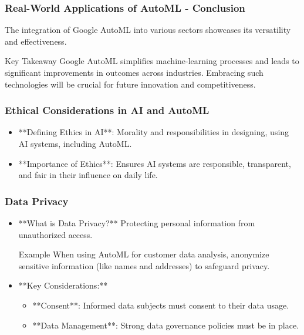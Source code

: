 \documentclass[aspectratio=169]{beamer}
\begin{document}
\begin{frame}[fragile]
  \frametitle{Real-World Applications of AutoML - Conclusion}
  The integration of Google AutoML into various sectors showcases its versatility and effectiveness. 
  \begin{block}{Key Takeaway}
      Google AutoML simplifies machine-learning processes and leads to significant improvements in outcomes across industries. Embracing such technologies will be crucial for future innovation and competitiveness.
  \end{block}
\end{frame}

\begin{frame}[fragile]
    \frametitle{Ethical Considerations in AI and AutoML}
    \begin{itemize}
        \item **Defining Ethics in AI**: Morality and responsibilities in designing, using AI systems, including AutoML.
        \item **Importance of Ethics**: Ensures AI systems are responsible, transparent, and fair in their influence on daily life.
    \end{itemize}
\end{frame}

\begin{frame}[fragile]
    \frametitle{Data Privacy}
    \begin{itemize}
        \item **What is Data Privacy?** Protecting personal information from unauthorized access.
        \begin{block}{Example}
            When using AutoML for customer data analysis, anonymize sensitive information (like names and addresses) to safeguard privacy.
        \end{block}
        \item **Key Considerations:**
        \begin{itemize}
            \item **Consent**: Informed data subjects must consent to their data usage.
            \item **Data Management**: Strong data governance policies must be in place.
        \end{itemize}
    \end{itemize}
\end{frame}
\end{document}

